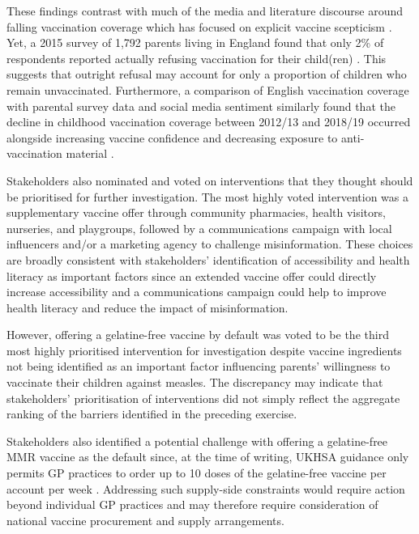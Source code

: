 \documentclass[12pt]{article}
\newcounter{who}
\begin{document}
These findings contrast with much of the media and literature discourse around falling vaccination coverage which has focused on explicit vaccine scepticism \cite{Stouts456}. Yet, a 2015 survey of 1,792 parents living in England found that only 2\% of respondents reported actually refusing vaccination for their child(ren) \cite{CAMPBELL20172979}. This suggests that outright refusal may account for only a proportion of children who remain unvaccinated. Furthermore, a comparison of English vaccination coverage with parental survey data and social media sentiment similarly found that the decline in childhood vaccination coverage between 2012/13 and 2018/19 occurred alongside increasing vaccine confidence and decreasing exposure to anti-vaccination material \cite{edelstein2020keep}.


Stakeholders also nominated and voted on interventions that they thought should be prioritised for further investigation. The most highly voted intervention was a supplementary vaccine offer through community pharmacies, health visitors, nurseries, and playgroups, followed by a communications campaign with local influencers and/or a marketing agency to challenge misinformation. These choices are broadly consistent with stakeholders' identification of accessibility and health literacy as important factors since an extended vaccine offer could directly increase accessibility and a communications campaign could help to improve health literacy and reduce the impact of misinformation. 

However, offering a gelatine-free vaccine by default was voted to be the third most highly prioritised intervention for investigation despite vaccine ingredients not being identified as an important factor influencing parents' willingness to vaccinate their children against measles. 
The discrepancy may indicate that stakeholders' prioritisation of interventions did not simply reflect the aggregate ranking of the barriers identified in the preceding exercise.  

Stakeholders also identified a potential challenge with offering a gelatine-free MMR vaccine as the default since, at the time of writing, UKHSA guidance only permits GP practices to order up to 10 doses of the gelatine-free vaccine per account per week \cite{UKHSA2025VaccineUpdate364}.  Addressing such supply-side constraints would require action beyond individual GP practices and may therefore require consideration of national vaccine procurement and supply arrangements.
\end{document}
